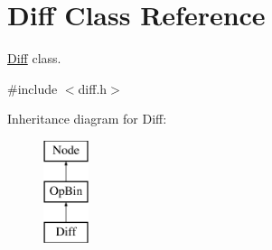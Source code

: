 \hypertarget{class_diff}{
\section{\-Diff \-Class \-Reference}
\label{class_diff}
}


\hyperlink{class_diff}{\-Diff} class.  




{\ttfamily \#include $<$diff.\-h$>$}

\-Inheritance diagram for \-Diff\-:\begin{figure}[H]
\begin{center}
\leavevmode
\includegraphics[height=3.000000cm]{class_diff}
\end{center}
\end{figure}
